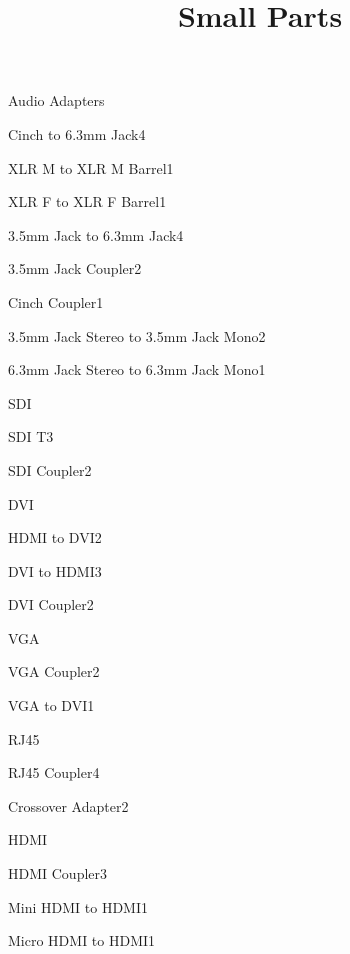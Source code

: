 \def\papersize{5}




\title{Small Parts}

\begin{checklist}{Audio Adapters}
  \item{Cinch to 6.3mm Jack}{4}
  \item{XLR M to XLR M Barrel}{1}
  \item{XLR F to XLR F Barrel}{1}
  \item{3.5mm Jack to 6.3mm Jack}{4}
  \item{3.5mm Jack Coupler}{2}
  \item{Cinch Coupler}{1}
  \item{3.5mm Jack Stereo to 3.5mm Jack Mono}{2}
  \item{6.3mm Jack Stereo to 6.3mm Jack Mono}{1}
\end{checklist}

\begin{checklist}{SDI}
  \item{SDI T}{3}
  \item{SDI Coupler}{2}
\end{checklist}

\begin{checklist}{DVI}
  \item{HDMI to DVI}{2}
  \item{DVI to HDMI}{3}
  \item{DVI Coupler}{2}
\end{checklist}

\begin{checklist}{VGA}
  \item{VGA Coupler}{2}
  \item{VGA to DVI}{1}
\end{checklist}

\begin{checklist}{RJ45}
  \item{RJ45 Coupler}{4}
  \item{Crossover Adapter}{2}
\end{checklist}

\begin{checklist}{HDMI}
  \item{HDMI Coupler}{3}
  \item{Mini HDMI to HDMI}{1}
  \item{Micro HDMI to HDMI}{1}
\end{checklist}


